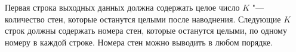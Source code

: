 Первая строка выходных данных должна содержать целое число $K$ "--- количество стен, которые 
останутся целыми после наводнения. 
Следующие $K$ строк должны содержать номера стен, которые останутся целыми, по одному номеру в 
каждой строке. Номера стен можно выводить в любом порядке.
